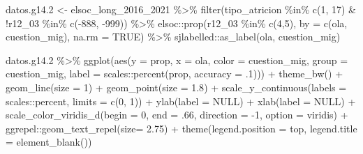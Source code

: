 \documentclass[
  12pt,
]{book}
\newenvironment{Shaded}{\begin{snugshade}}{\end{snugshade}}
\newcommand{\AttributeTok}[1]{\textcolor[rgb]{0.77,0.63,0.00}{#1}}
\newcommand{\ConstantTok}[1]{\textcolor[rgb]{0.00,0.00,0.00}{#1}}
\newcommand{\DecValTok}[1]{\textcolor[rgb]{0.00,0.00,0.81}{#1}}
\newcommand{\FloatTok}[1]{\textcolor[rgb]{0.00,0.00,0.81}{#1}}
\newcommand{\FunctionTok}[1]{\textcolor[rgb]{0.00,0.00,0.00}{#1}}
\newcommand{\NormalTok}[1]{#1}
\newcommand{\OtherTok}[1]{\textcolor[rgb]{0.56,0.35,0.01}{#1}}
\newcommand{\SpecialCharTok}[1]{\textcolor[rgb]{0.00,0.00,0.00}{#1}}
\newcommand{\StringTok}[1]{\textcolor[rgb]{0.31,0.60,0.02}{#1}}
\begin{document}
\begin{Shaded}
\begin{Highlighting}[]
\NormalTok{datos.g14}\FloatTok{.2} \OtherTok{\textless{}{-}}\NormalTok{ elsoc\_long\_2016\_2021 }\SpecialCharTok{\%\textgreater{}\%} 
  \FunctionTok{filter}\NormalTok{(tipo\_atricion }\SpecialCharTok{\%in\%} \FunctionTok{c}\NormalTok{(}\DecValTok{1}\NormalTok{, }\DecValTok{17}\NormalTok{) }\SpecialCharTok{\&} \SpecialCharTok{!}\NormalTok{r12\_03 }\SpecialCharTok{\%in\%} \FunctionTok{c}\NormalTok{(}\SpecialCharTok{{-}}\DecValTok{888}\NormalTok{, }\SpecialCharTok{{-}}\DecValTok{999}\NormalTok{)) }\SpecialCharTok{\%\textgreater{}\%} 
\NormalTok{  elsoc}\SpecialCharTok{::}\FunctionTok{prop}\NormalTok{(r12\_03 }\SpecialCharTok{\%in\%} \FunctionTok{c}\NormalTok{(}\DecValTok{4}\NormalTok{,}\DecValTok{5}\NormalTok{), }\AttributeTok{by =} \FunctionTok{c}\NormalTok{(ola, cuestion\_mig), }\AttributeTok{na.rm =} \ConstantTok{TRUE}\NormalTok{) }\SpecialCharTok{\%\textgreater{}\%} 
\NormalTok{  sjlabelled}\SpecialCharTok{::}\FunctionTok{as\_label}\NormalTok{(ola, cuestion\_mig)}

\NormalTok{datos.g14}\FloatTok{.2} \SpecialCharTok{\%\textgreater{}\%} 
  \FunctionTok{ggplot}\NormalTok{(}\FunctionTok{aes}\NormalTok{(}\AttributeTok{y =}\NormalTok{ prop, }\AttributeTok{x =}\NormalTok{ ola, }\AttributeTok{color =}\NormalTok{ cuestion\_mig, }\AttributeTok{group =}\NormalTok{ cuestion\_mig,}
                           \AttributeTok{label =}\NormalTok{ scales}\SpecialCharTok{::}\FunctionTok{percent}\NormalTok{(prop, }\AttributeTok{accuracy =}\NormalTok{ .}\DecValTok{1}\NormalTok{))) }\SpecialCharTok{+}
  \FunctionTok{theme\_bw}\NormalTok{() }\SpecialCharTok{+}   
  \FunctionTok{geom\_line}\NormalTok{(}\AttributeTok{size =} \DecValTok{1}\NormalTok{) }\SpecialCharTok{+}
  \FunctionTok{geom\_point}\NormalTok{(}\AttributeTok{size =} \FloatTok{1.8}\NormalTok{) }\SpecialCharTok{+}
  \FunctionTok{scale\_y\_continuous}\NormalTok{(}\AttributeTok{labels =}\NormalTok{ scales}\SpecialCharTok{::}\NormalTok{percent,}
                     \AttributeTok{limits =} \FunctionTok{c}\NormalTok{(}\DecValTok{0}\NormalTok{, }\DecValTok{1}\NormalTok{)) }\SpecialCharTok{+}
  \FunctionTok{ylab}\NormalTok{(}\AttributeTok{label =} \ConstantTok{NULL}\NormalTok{) }\SpecialCharTok{+}
  \FunctionTok{xlab}\NormalTok{(}\AttributeTok{label =} \ConstantTok{NULL}\NormalTok{) }\SpecialCharTok{+}
  \FunctionTok{scale\_color\_viridis\_d}\NormalTok{(}\AttributeTok{begin =} \DecValTok{0}\NormalTok{, }\AttributeTok{end =}\NormalTok{ .}\DecValTok{66}\NormalTok{, }\AttributeTok{direction =} \SpecialCharTok{{-}}\DecValTok{1}\NormalTok{, }\AttributeTok{option =} \StringTok{\textquotesingle{}viridis\textquotesingle{}}\NormalTok{) }\SpecialCharTok{+}
\NormalTok{  ggrepel}\SpecialCharTok{::}\FunctionTok{geom\_text\_repel}\NormalTok{(}\AttributeTok{size=} \FloatTok{2.75}\NormalTok{) }\SpecialCharTok{+}
  \FunctionTok{theme}\NormalTok{(}\AttributeTok{legend.position =} \StringTok{\textquotesingle{}top\textquotesingle{}}\NormalTok{,}
        \AttributeTok{legend.title =} \FunctionTok{element\_blank}\NormalTok{())}
\end{Highlighting}
\end{Shaded}
\end{document}
